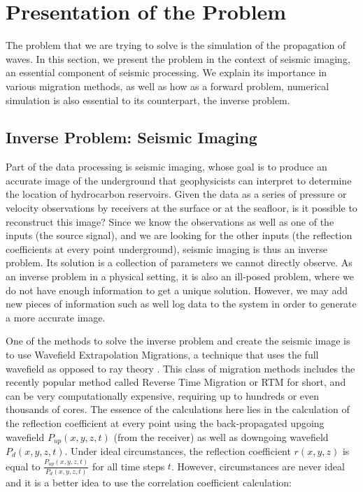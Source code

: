 \newpage
\section{Presentation of the Problem}

The problem that we are trying to solve is the simulation of the propagation of waves. In this section, we present the problem in the context of seismic imaging, an essential component of seismic processing. We explain its importance in various migration methods, as well as how as a forward problem, numerical simulation is also essential to its counterpart, the inverse problem.

\subsection{Inverse Problem: Seismic Imaging}

Part of the data processing is seismic imaging, whose goal is to produce an accurate image of the underground that geophysicists can interpret to determine the location of hydrocarbon reservoirs. Given the data as a series of pressure or velocity observations by receivers at the surface or at the seafloor, is it possible to reconstruct this image? Since we know the observations as well as one of the inputs (the source signal), and we are looking for the other inputs (the reflection coefficients at every point underground), seismic imaging is thus an inverse problem. Its solution is a collection of parameters we cannot directly observe. As an inverse problem in a physical setting, it is also an ill-posed problem, where we do not have enough information to get a unique solution. However, we may add new pieces of information such as well log data to the system in order to generate a more accurate image. 


One of the methods to solve the inverse problem and create the seismic image is to use Wavefield Extrapolation Migrations, a technique that uses the full wavefield as opposed to ray theory \cite{EAGE}. This class of migration methods includes the recently popular method called Reverse Time Migration or RTM for short, and can be very computationally expensive, requiring up to hundreds or even thousands of cores. The essence of the calculations here lies in the calculation of the reflection coefficient at every point using the back-propagated upgoing wavefield $P_{up}(x,y,z,t)$ (from the receiver) as well as downgoing wavefield $P_{d}(x,y,z,t)$. Under ideal circumstances, the reflection coefficient $r(x,y,z)$ is equal to $\frac{P_{up}(x,y,z,t)}{P_d(x,y,z,t)}$ for all time steps $t$. However, circumstances are never ideal and it is a better idea to use the correlation coefficient calculation:

